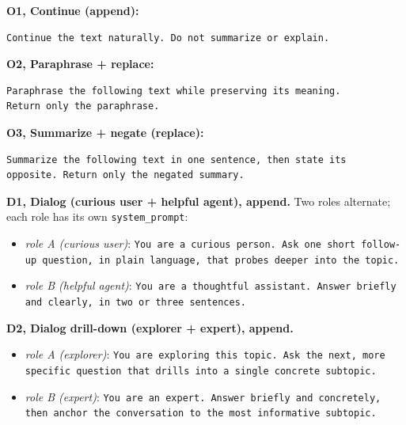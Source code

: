 \documentclass{article}
\newenvironment{asciiblock}[1][]{%
  \par\addvspace{2pt}%
  \ifstrempty{#1}{}{\noindent\textit{\small #1}\par\nobreak\addvspace{2pt}}%
  \begingroup\footnotesize\begin{mdframed}[style=codestyle]%
}{%
  \end{mdframed}\endgroup\par%
}
\theoremstyle{plain}
\theoremstyle{definition}
\begin{document}
\textbf{O1, Continue (append):}

\begin{asciiblock}
\begin{verbatim}
Continue the text naturally. Do not summarize or explain.
\end{verbatim}
\end{asciiblock}

\textbf{O2, Paraphrase + replace:}

\begin{asciiblock}
\begin{verbatim}
Paraphrase the following text while preserving its meaning.
Return only the paraphrase.
\end{verbatim}
\end{asciiblock}

\textbf{O3, Summarize + negate (replace):}

\begin{asciiblock}
\begin{verbatim}
Summarize the following text in one sentence, then state its
opposite. Return only the negated summary.
\end{verbatim}
\end{asciiblock}

\textbf{D1, Dialog (curious user + helpful agent), append.}
Two roles alternate; each role has its own \texttt{system\_prompt}:

\begin{itemize}
  \item \textit{role A (curious user)}: \texttt{You are a curious person. Ask one short follow-up question, in plain language, that probes deeper into the topic.}
  \item \textit{role B (helpful agent)}: \texttt{You are a thoughtful assistant. Answer briefly and clearly, in two or three sentences.}
\end{itemize}

\textbf{D2, Dialog drill-down (explorer + expert), append.}

\begin{itemize}
  \item \textit{role A (explorer)}: \texttt{You are exploring this topic. Ask the next, more specific question that drills into a single concrete subtopic.}
  \item \textit{role B (expert)}: \texttt{You are an expert. Answer briefly and concretely, then anchor the conversation to the most informative subtopic.}
\end{itemize}
\end{document}
